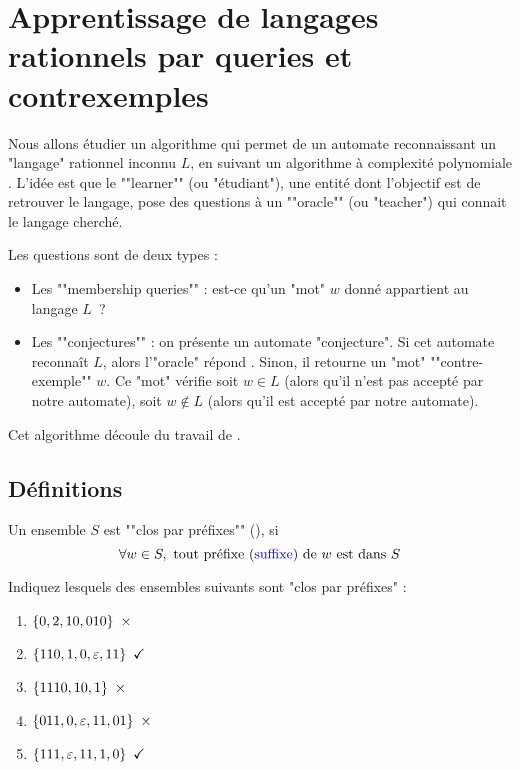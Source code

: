 \section{Apprentissage de langages rationnels par queries et contrexemples}

Nous allons étudier un algorithme qui permet de  un automate reconnaissant un "langage" rationnel inconnu $L$,
en suivant un algorithme à complexité polynomiale .
L'idée est que le ""learner"" (ou "étudiant"), une entité dont l'objectif est de retrouver le langage, pose des
questions à un ""oracle"" (ou "teacher") qui connait le langage cherché.

Les questions sont de deux types :
\begin{itemize}
	\item Les ""membership queries"" : est-ce qu'un "mot" $w$ donné appartient au langage $L$ ?
	\item Les ""conjectures"" : on présente un automate "conjecture". Si cet automate reconnaît $L$, alors
	      l'"oracle" répond .
	      Sinon, il retourne un "mot" ""contre-exemple"" $w$. Ce "mot" vérifie soit $w \in L$ (alors qu'il
	      n’est pas accepté par notre automate), soit $w \notin L$ (alors qu'il est accepté par notre automate).
\end{itemize}

Cet algorithme découle du travail de \cite{angluinLearning}.


\subsection{Définitions}


\begin{definition}
	Un ensemble $S$ est ""clos par préfixes"" (), si
	$$\forall w \in S, \text{ tout préfixe (\textcolor{blue}{suffixe}) de $w$ est dans } S$$
\end{definition}

\begin{exercice}
	Indiquez lesquels des ensembles suivants sont "clos par préfixes" :
	\begin{enumerate}
		\item $\set{0,2,10,010} \ \times$
		\item $\set{110,1,0,\motvide,11} \ \checkmark$
		\item $\set{1110,10,1} \ \times$
		\item $\set{011,0,\motvide,11,01} \ \times$
		\item $\set{111,\motvide,11,1,0} \ \checkmark$
	\end{enumerate}
\end{exercice}

